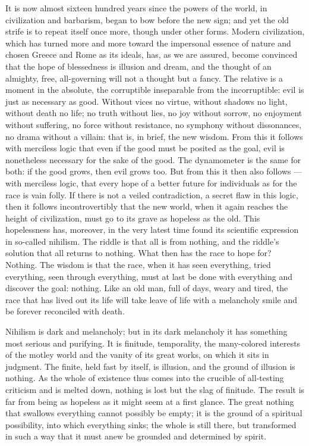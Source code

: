 \documentclass[12pt,a4paper,openany]{book}
\newcommand{\opage}[1]{\marginnote{\footnotesize\textit{[#1]}}}
\begin{document}
It is now almost sixteen hundred years since the powers of the world, in civilization and
barbarism, began to bow before the new sign; and yet the old strife is to repeat itself once
more, though under other forms. Modern civilization, which has turned more and more toward the
impersonal essence of nature and chosen Greece and Rome as its ideals, has, as we are assured,
become convinced that the hope of blessedness is illusion and dream, and the thought of an
almighty, free, all-governing will not a thought but a fancy. The relative is a moment in the
absolute, the corruptible inseparable from the incorruptible: evil is just as necessary as
good. Without vices no virtue, without shadows no light, without death no life; no truth
without lies, no joy without sorrow, no enjoyment without suffering, no force without
resistance, no symphony without dissonances, no drama without a villain: that is, in brief, the
new wisdom. From this it follows with merciless logic that even if the good must be posited as
the goal, evil is nonetheless necessary for the sake of the good. The dynamometer is the same
for both: if the good grows, then evil grows too. But from this
\setcounter{footnote}{0}%
\opage{49}it then also follows --- with merciless logic, that every hope of a better future for
individuals as for the race is vain folly. If there is not a veiled contradiction, a secret
flaw in this logic, then it follows incontrovertibly that the new world, when it again reaches
the height of civilization, must go to its grave as hopeless as the old. This hopelessness has,
moreover, in the very latest time found its scientific expression in so-called nihilism. The
riddle is that all is from nothing, and the riddle's solution that all returns to nothing. What
then has the race to hope for? Nothing. The wisdom is that the race, when it has seen
everything, tried everything, seen through everything, must at last be done with everything and
discover the goal: nothing. Like an old man, full of days, weary and tired, the race that has
lived out its life will take leave of life with a melancholy smile and be forever reconciled
with death.

Nihilism is dark and melancholy; but in its dark melancholy it has something most serious and
purifying. It is finitude, temporality, the many-colored interests of the motley world and the
vanity of its great works, on which it sits in judgment. The finite, held fast by itself, is
illusion, and the ground of illusion is nothing. As the whole of existence thus comes into the
crucible of all-testing criticism and is melted down, nothing is lost but the slag of finitude.
The result is far from being as hopeless as it might seem at a first glance. The great nothing
that swallows everything cannot possibly be empty; it is the ground of a spiritual possibility,
into which everything sinks; the whole is still there, but transformed in such a way that it
must anew be grounded and determined by spirit.
\end{document}
